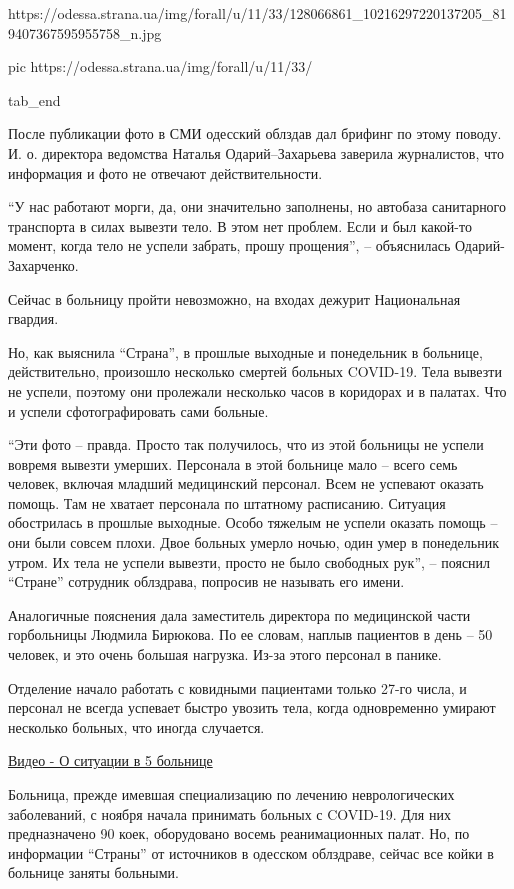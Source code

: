 https://odessa.strana.ua/img/forall/u/11/33/128066861_10216297220137205_819407367595955758_n.jpg

pic https://odessa.strana.ua/img/forall/u/11/33/%

tab_end
\fi

После публикации фото в СМИ одесский облздав дал брифинг по этому поводу. И. о.
директора ведомства Наталья Одарий–Захарьева заверила журналистов, что
информация и фото не отвечают действительности.

\enquote{У нас работают морги, да, они значительно заполнены, но автобаза санитарного
транспорта в силах вывезти тело. В этом нет проблем. Если и был какой-то
момент, когда тело не успели забрать, прошу прощения}, – объяснилась
Одарий-Захарченко.

Сейчас в больницу пройти невозможно, на входах дежурит Национальная гвардия.

Но, как выяснила \enquote{Страна}, в прошлые выходные и понедельник в больнице,
действительно, произошло несколько смертей больных COVID-19. Тела вывезти не
успели, поэтому они пролежали несколько часов в коридорах и в палатах. Что и
успели сфотографировать сами больные.

\enquote{Эти фото – правда. Просто так получилось, что из этой больницы не
успели вовремя вывезти умерших. Персонала в этой больнице мало – всего семь
человек, включая младший медицинский персонал. Всем не успевают оказать помощь.
Там не хватает персонала по штатному расписанию. Ситуация обострилась в прошлые
выходные. Особо тяжелым не успели оказать помощь – они были совсем плохи. Двое
больных умерло ночью, один умер в понедельник утром. Их тела не успели вывезти,
просто не было свободных рук}, – пояснил \enquote{Стране} сотрудник облздрава,
попросив не называть его имени.

Аналогичные пояснения дала заместитель директора по медицинской части
горбольницы Людмила Бирюкова. По ее словам, наплыв пациентов в день – 50
человек, и это очень большая нагрузка. Из-за этого персонал в панике.

Отделение начало работать с ковидными пациентами только 27-го числа, и персонал
не всегда успевает быстро увозить тела, когда одновременно умирают несколько
больных, что иногда случается.

\href{https://youtu.be/wDFuU0nTUCg}{Видео - О ситуации в 5 больнице}

Больница, прежде имевшая специализацию по лечению неврологических заболеваний,
с ноября начала принимать больных с COVID-19. Для них предназначено 90 коек,
оборудовано восемь реанимационных палат. Но, по информации \enquote{Страны} от
источников в одесском облздраве, сейчас все койки в больнице заняты больными.

